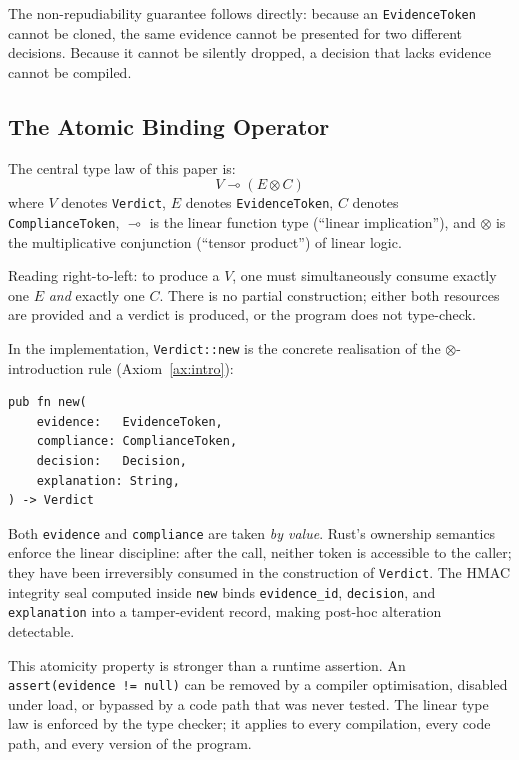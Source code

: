 The non-repudiability guarantee follows directly: because an
\texttt{EvidenceToken} cannot be cloned, the same evidence cannot be
presented for two different decisions.  Because it cannot be silently
dropped, a decision that lacks evidence cannot be compiled.

\subsection{The Atomic Binding Operator}
\label{sec:binding}

The central type law of this paper is:
\[
  V \multimap (E \otimes C)
\]
where $V$ denotes \texttt{Verdict}, $E$ denotes \texttt{EvidenceToken},
$C$ denotes \texttt{ComplianceToken}, $\multimap$ is the linear
function type (``linear implication''), and $\otimes$ is the
multiplicative conjunction (``tensor product'') of linear logic.

Reading right-to-left: to produce a $V$, one must simultaneously
consume exactly one $E$ \emph{and} exactly one $C$.  There is no
partial construction; either both resources are provided and a
verdict is produced, or the program does not type-check.

In the implementation, \texttt{Verdict::new} is the concrete
realisation of the $\otimes$-introduction rule
(Axiom~\ref{ax:intro}):

\begin{verbatim}
pub fn new(
    evidence:   EvidenceToken,
    compliance: ComplianceToken,
    decision:   Decision,
    explanation: String,
) -> Verdict
\end{verbatim}

Both \texttt{evidence} and \texttt{compliance} are taken \emph{by
value}.  Rust's ownership semantics enforce the linear discipline:
after the call, neither token is accessible to the caller; they have
been irreversibly consumed in the construction of \texttt{Verdict}.
The HMAC integrity seal computed inside \texttt{new} binds
\texttt{evidence\_id}, \texttt{decision}, and \texttt{explanation}
into a tamper-evident record, making post-hoc alteration detectable.

This atomicity property is stronger than a runtime assertion.  An
\texttt{assert(evidence != null)} can be removed by a compiler
optimisation, disabled under load, or bypassed by a code path that
was never tested.  The linear type law is enforced by the type
checker; it applies to every compilation, every code path, and every
version of the program.

